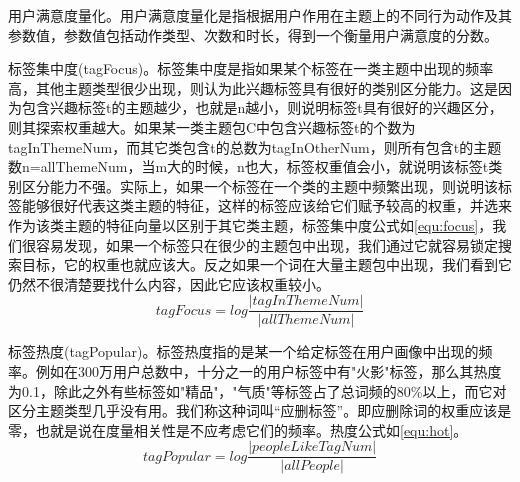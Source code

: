   用户满意度量化。用户满意度量化是指根据用户作用在主题上的不同行为动作及其参数值，参数值包括动作类型、次数和时长，得到一个衡量用户满意度的分数。

  标签集中度(tagFocus)。标签集中度是指如果某个标签在一类主题中出现的频率高，其他主题类型很少出现，则认为此兴趣标签具有很好的类别区分能力。这是因为包含兴趣标签t的主题越少，也就是n越小，则说明标签t具有很好的兴趣区分，则其探索权重越大。如果某一类主题包C中包含兴趣标签t的个数为tagInThemeNum，而其它类包含t的总数为tagInOtherNum，则所有包含t的主题数n=allThemeNum，当m大的时候，n也大，标签权重值会小，就说明该标签t类别区分能力不强。实际上，如果一个标签在一个类的主题中频繁出现，则说明该标签能够很好代表这类主题的特征，这样的标签应该给它们赋予较高的权重，并选来作为该类主题的特征向量以区别于其它类主题，标签集中度公式如\autoref{equ:focus}，我们很容易发现，如果一个标签只在很少的主题包中出现，我们通过它就容易锁定搜索目标，它的权重也就应该大。反之如果一个词在大量主题包中出现，我们看到它仍然不很清楚要找什么内容，因此它应该权重较小。
  \begin{equation}
    tagFocus=log\frac{|tagInThemeNum|}{|allThemeNum|}
    \label{equ:focus}
  \end{equation}


  标签热度(tagPopular)。标签热度指的是某一个给定标签在用户画像中出现的频率。例如在300万用户总数中，十分之一的用户标签中有"火影"标签，那么其热度为0.1，除此之外有些标签如"精品"，"气质"等标签占了总词频的80\%以上，而它对区分主题类型几乎没有用。我们称这种词叫“应删标签”。即应删除词的权重应该是零，也就是说在度量相关性是不应考虑它们的频率。热度公式如\autoref{equ:hot}。
  \begin{equation}
    tagPopular=log\frac{|peopleLikeTagNum|}{|allPeople|}
    \label{equ:hot}
  \end{equation}

